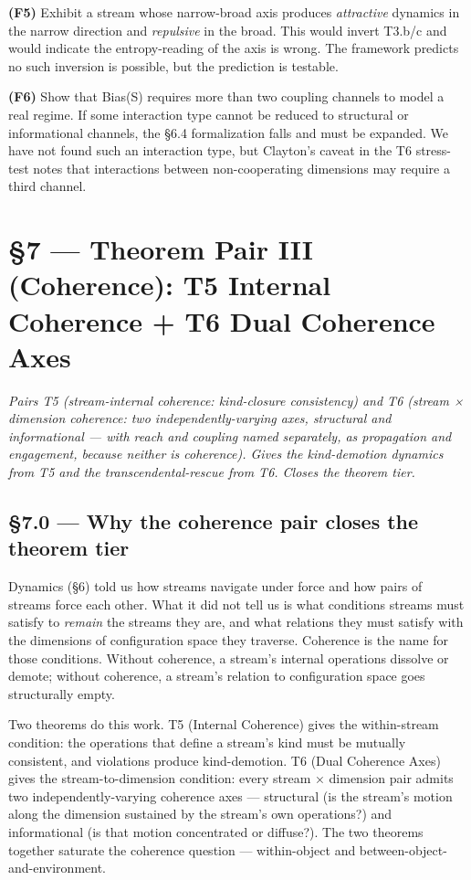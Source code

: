 \documentclass[11pt, openany]{book}
\newcommand{\sectionbreak}{\clearpage}
\begin{document}
\textbf{(F5)} Exhibit a stream whose narrow-broad axis produces \textit{attractive} dynamics in the narrow direction and \textit{repulsive} in the broad. This would invert T3.b/c and would indicate the entropy-reading of the axis is wrong. The framework predicts no such inversion is possible, but the prediction is testable.

\textbf{(F6)} Show that Bias(S) requires more than two coupling channels to model a real regime. If some interaction type cannot be reduced to structural or informational channels, the §6.4 formalization falls and must be expanded. We have not found such an interaction type, but Clayton's caveat in the T6 stress-test notes that interactions between non-cooperating dimensions may require a third channel.

\chapter{§7 — Theorem Pair III (Coherence): T5 Internal Coherence + T6 Dual Coherence Axes}


\textit{Pairs T5 (stream-internal coherence: kind-closure consistency) and T6 (stream × dimension coherence: two independently-varying axes, structural and informational --- with reach and coupling named separately, as propagation and engagement, because neither is coherence). Gives the kind-demotion dynamics from T5 and the transcendental-rescue from T6. Closes the theorem tier.}

\sectionbreak

\section{§7.0 --- Why the coherence pair closes the theorem tier}

Dynamics (§6) told us how streams navigate under force and how pairs of streams force each other. What it did not tell us is what conditions streams must satisfy to \textit{remain} the streams they are, and what relations they must satisfy with the dimensions of configuration space they traverse. Coherence is the name for those conditions. Without coherence, a stream's internal operations dissolve or demote; without coherence, a stream's relation to configuration space goes structurally empty.

Two theorems do this work. T5 (Internal Coherence) gives the within-stream condition: the operations that define a stream's kind must be mutually consistent, and violations produce kind-demotion. T6 (Dual Coherence Axes) gives the stream-to-dimension condition: every stream × dimension pair admits two independently-varying coherence axes --- structural (is the stream's motion along the dimension sustained by the stream's own operations?) and informational (is that motion concentrated or diffuse?). The two theorems together saturate the coherence question --- within-object and between-object-and-environment.
\end{document}
